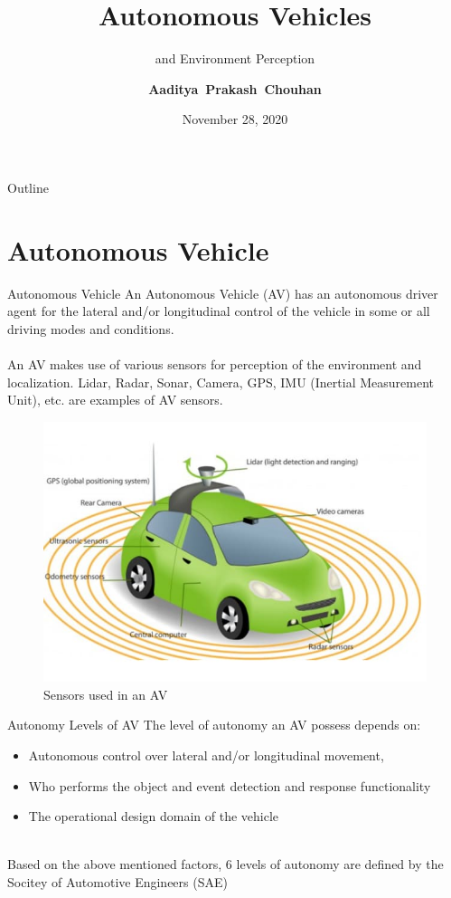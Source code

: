 \documentclass{beamer}
\title[Open Seminar]{Autonomous Vehicles}
\subtitle{and Environment Perception}
\author[A.P. Chouhan]{\textbf{Aaditya~Prakash~Chouhan}}
\institute[] %
{
\\	
\textbf{Hackathon Presentation}\\~\\
\textit{aadityaprakash.chouhan@gmail.com}

}
\date[November 28, 2020]{November 28, 2020}
\begin{document}
\begin{frame}
  \titlepage
\end{frame}

\begin{frame}{Outline}
  \tableofcontents
\end{frame}


\section{Autonomous Vehicle}
\begin{frame}{Autonomous Vehicle}
	An Autonomous Vehicle (AV) has an autonomous driver agent for the lateral and/or longitudinal control of the vehicle in some or all driving modes and conditions.\\~\\
	An AV makes use of various sensors for perception of the environment and localization. Lidar, Radar, Sonar, Camera, GPS, IMU (Inertial Measurement Unit), etc. are examples of AV sensors.
	\begin{figure}
		\centering
		\includegraphics[scale = 0.25]{figures/AV sensors image coutsey_engineering}
		\caption{Sensors used in an AV}
		\label{avsensors}
	\end{figure}
\end{frame}
\begin{frame}{Autonomy Levels of AV}
	The level of autonomy an AV possess depends on:
	\begin{itemize} 
		\item Autonomous control over lateral and/or longitudinal movement,
		\item Who performs the object and event detection and response functionality
		\item The operational design domain of the vehicle\\~\\
		\end{itemize}
	Based on the above mentioned factors, 6 levels of autonomy are defined by the Socitey of Automotive Engineers (SAE) \footnotemark
\end{frame}
\end{document}
